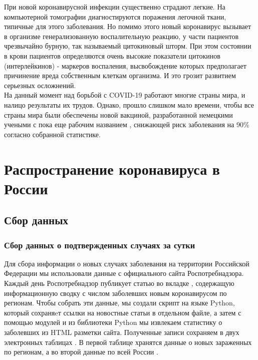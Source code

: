 \documentclass[a4paper, 12pt]{extarticle}
\begin{document}
При новой коронавирусной инфекции существенно страдают легкие. На компьютерной
томографии диагностируются поражения легочной ткани, типичные для этого
заболевания. Но помимо этого новый коронавирус вызывает в организме
генерализованную воспалительную реакцию, у части пациентов чрезвычайно бурную,
так называемый цитокиновый шторм. При этом состоянии в крови пациентов
определяются очень высокие показатели цитокинов (интерлейкинов) - маркеров
воспаления, высвобождение которых предполагает причинение вреда собственным
клеткам организма. И это грозит развитием серьезных осложнений.
\\

На данный момент над борьбой с COVID-19 работают многие
страны мира, и налицо результаты их трудов. Однако, прошло слишком мало времени,
чтобы все страны мира были обеспечены новой вакциной, разработанной немецкими
учеными с пока еще рабочим названием , снижающей риск заболевания на
90\% согласно собранной статистике.
\\
\newpage

\section{Распространение коронавируса в России}
\subsection{Сбор данных}
\subsubsection{Сбор данных о подтвержденных случаях за сутки}

Для сбора информации о новых случаях заболевания на территории Российской
Федерации мы использовали данные с официального сайта Роспотребнадзора. Каждый
день Роспотребнадзор публикует статью во вкладке ,
содержащую информационную сводку с числом заболевших новым коронавирусом по
регионам. Чтобы собрать эти данные, мы создали скрипт на языке Python, который
сохраняeт ссылки на новостные статьи в отдельном файле, а затем с помощью
модулей  и  из библиотеки Python
мы извлекаем статистику о заболевших из HTML разметки сайта. Полученные записи
сохраняем в двух электронных таблицах . В первой таблице хранятся
данные о новых зараженных по регионам, а во второй данные по всей России .
\end{document}

